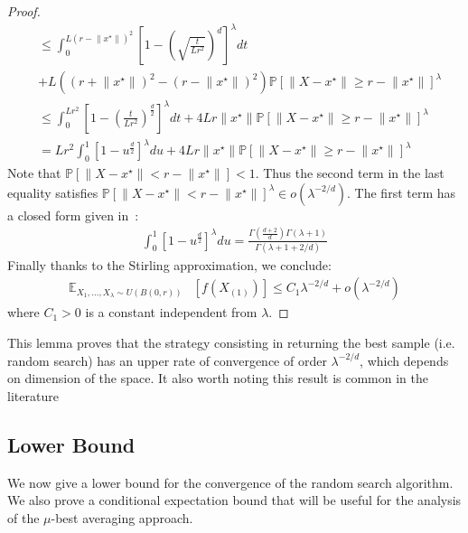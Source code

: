 \begin{proof}
\begin{align*}
&\leq \int_0^{L\left(r-\lVert x^\star\rVert\right)^2} \left[ 1-\left(\sqrt{\frac{t}{Lr^2}}\right)^d\right]^\lambda dt\\
 &+L\left(\left(r+\lVert x^\star\rVert\right)^2-\left(r-\lVert x^\star\rVert\right)^2\right) \mathbb{P}\left[ \lVert X-x^\star\rVert \geq r-\lVert x^\star\rVert\right]^\lambda \\
&\leq \int_0^{Lr^2} \left[ 1-\left(\frac{t}{Lr^2}\right)^{\frac{d}{2}}\right]^\lambda dt+4Lr\lVert x^\star\rVert\mathbb{P}\left[ \lVert X-x^\star\rVert \geq r-\lVert x^\star\rVert\right]^\lambda\\
&= Lr^2\int_0^{1} \left[ 1-u^{\frac{d}{2}}\right]^\lambda du+4Lr\lVert x^\star\rVert\mathbb{P}\left[ \lVert X-x^\star\rVert \geq r-\lVert x^\star\rVert\right]^\lambda
\end{align*}
Note that  $\mathbb{P}\left[ \lVert X-x^\star\rVert < r-\lVert x^\star\rVert\right] < 1$. Thus the second term in the last equality satisfies $\mathbb{P}\left[ \lVert X-x^\star\rVert < r-\lVert x^\star\rVert\right]^\lambda
\in o(\lambda^{-2/d})$.
The first term has a closed form given in~\cite{ppsnkbest}:
\begin{align*}
    \int_0^{1} \left[ 1-u^{\frac{d}{2}}\right]^\lambda du=\frac{\Gamma(\frac{d+2}{d})\Gamma(\lambda+1)}{\Gamma(\lambda+1+2/d)}
\end{align*}
Finally thanks to the Stirling approximation, we conclude:
\begin{align*}
\mathbb{E}_{X_1,\dots,X_\lambda\sim U(B(0,r))}&\left[ f\left(X_{(1)}\right)\right]\leq C_1 \lambda^{-2/d}+o(\lambda^{-2/d})
\end{align*}
where $C_1>0$ is a constant independent from $\lambda$.
\end{proof}
This lemma proves that the strategy consisting in returning the best sample (i.e. random search) has an upper rate of convergence of order $\lambda^{-2/d}$, which depends on dimension of the space. It also worth noting this result is common in the literature~\cite{bach,bergstra2012random}

\subsection{Lower Bound}
We now give a lower bound for the convergence of the random search algorithm. We also prove a conditional expectation bound that will be useful for the analysis of the $\mu$-best averaging approach.


